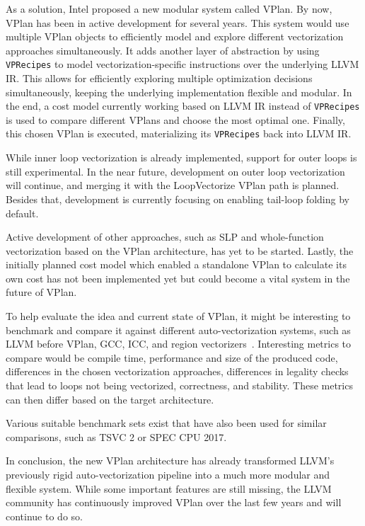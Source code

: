 \documentclass[sigplan,11pt,nonacm]{acmart}
\begin{document}
As a solution, Intel proposed a new modular system called VPlan.
By now, VPlan has been in active development for several years. 
This system would use multiple VPlan objects to efficiently 
model and explore different vectorization approaches simultaneously.
It adds another layer of abstraction by using \texttt{VPRecipes} to model 
vectorization-specific instructions over the underlying LLVM IR. 
This allows for efficiently exploring multiple optimization decisions simultaneously, 
keeping the underlying implementation flexible and modular. In the end, a cost model currently 
working based on LLVM IR instead of \texttt{VPRecipes} is used to compare different VPlans 
and choose the most optimal one. Finally, this chosen VPlan is executed, materializing its \texttt{VPRecipes} 
back into LLVM IR.

While inner loop vectorization is already implemented, support for outer loops is still experimental. 
In the near future, development on outer loop vectorization will continue, and merging 
it with the LoopVectorize VPlan path is planned. Besides that, development is currently focusing on enabling 
tail-loop folding by default.

Active development of other approaches, such as SLP and whole-function vectorization based on the VPlan 
architecture, has yet to be started. Lastly, the initially planned cost model which enabled a standalone 
VPlan to calculate its own cost has not been implemented yet but could become a vital system in the future 
of VPlan.

To help evaluate the idea and current state of VPlan, it might be interesting to benchmark and 
compare it against different auto-vectorization systems, 
such as LLVM before VPlan, 
GCC, ICC, and region vectorizers~\cite{Moll_2021,10.1145/3303117.3306172,rv}. Interesting 
metrics to 
compare would be compile time, performance and size of the produced code, differences in the chosen 
vectorization approaches, differences in legality checks that lead to loops not being vectorized, 
correctness, and stability. These metrics can then differ based on the target architecture.

Various suitable benchmark sets exist that have also been used for similar 
comparisons, such as TSVC 2 or SPEC CPU 2017.

In conclusion, the new VPlan architecture has already transformed LLVM's previously rigid auto-vectorization 
pipeline into a much more modular and flexible system. While some important features are still missing, the 
LLVM community has continuously improved VPlan over the last few years and will continue to do so.



\end{document}
